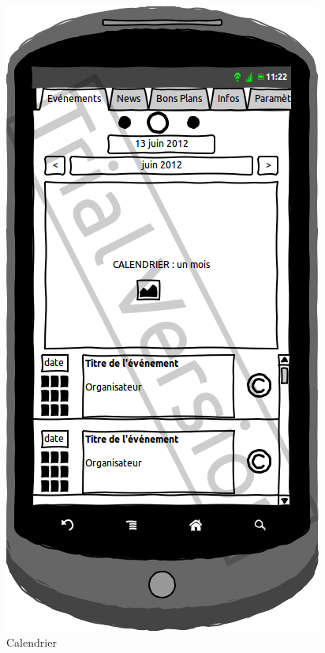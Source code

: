 \documentclass[a4paper, 11pt]{article}
\begin{document}
\begin{figure}[htbp]
	\begin{minipage}[c]{.50\linewidth}
		\begin{center}
			\includegraphics[scale=0.3]{../../Sketch/Android/Calendrier.png}
		\end{center}
	\caption{Calendrier}
	\end{minipage}
	\hfill
	\begin{minipage}[c]{.50\linewidth}
		\begin{center}

\end{center}
\end{minipage}
\end{figure}
\end{document}
